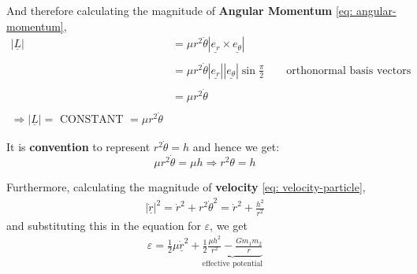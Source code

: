 And therefore calculating the magnitude of {\bf Angular Momentum} \eqref{eq:
	angular-momentum},
$$
	\begin{aligned}
		|\underline{L}| & = \mu r^{2}\dot{\theta}|\underline{e_{r}} \times \underline{e_{\theta}}|                                                   \\ \\
		                & = \mu r^{2}\dot{\theta}|\underline{e_{r}}| |\underline{e_{\theta}}| \sin \frac{\pi}{2} \ \ \ \ \ \ \ \ \ \text{orthonormal
		basis vectors}                                                                                                                               \\ \\
		                & = \mu r^{2}\dot{\theta}                                                                                                    \\ \\
		\Rightarrow |\underline{L}| = \text{ CONSTANT } = \mu r^{2}\dot{\theta}
	\end{aligned}
$$

It is {\bf convention} to represent $r^{2} \dot{\theta} = h$
and hence we get:
$$\mu r^{2} \dot{\theta} = \mu h \Rightarrow r^{2}\theta = h$$

Furthermore, calculating the magnitude of {\bf velocity} \eqref{eq:
	velocity-particle},
$$
	\begin{aligned}
		|\underline{\dot{r}}|^{2} = \dot{r}^{2} + r^{2}\dot{\theta}^{2} = \dot{r}^{2} + \frac{h^{2}}{r^{2}}
	\end{aligned}
$$
and substituting this in the equation for $\varepsilon$, we get
$$
	\begin{aligned}
		\varepsilon = \frac{1}{2}\mu \underline{\dot{r}}^{2} + \underbrace{\frac{1}{2}\frac{\mu h^{2}}{r^{2}} - \frac{Gm_{1}m_{2}}{r}}_{\text{effective potential}}
	\end{aligned}
$$
